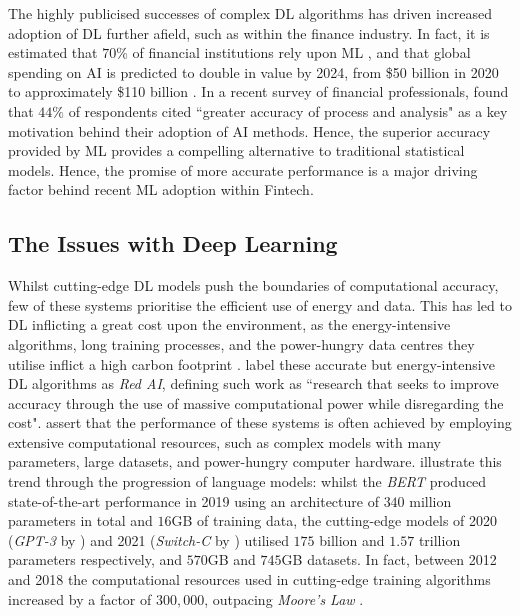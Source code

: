 \documentclass[a4paper, 11pt]{report}
\begin{document}
    The highly publicised successes of complex DL algorithms has driven increased adoption of DL further afield, such as within the finance industry. In fact, it is estimated that $70\%$ of financial institutions rely upon ML \citep{gokhale-2019}, and that global spending on AI is predicted to double in value by 2024, from \$50 billion in 2020 to approximately \$110 billion \citep{oecd-2021}. In a recent survey of financial professionals, \citet{chartis-2019} found that $44\%$ of respondents cited ``greater accuracy of process and analysis" as a key motivation behind their adoption of AI methods. Hence, the superior accuracy provided by ML provides a compelling alternative to traditional statistical models. Hence, the promise of more accurate performance is a major driving factor behind recent ML adoption within Fintech.


    \subsection{The Issues with Deep Learning}

    Whilst cutting-edge DL models push the boundaries of computational accuracy, few of these systems prioritise the efficient use of energy and data. This has led to DL inflicting a great cost upon the environment, as the energy-intensive algorithms, long training processes, and the power-hungry data centres they utilise inflict a high carbon footprint \citep{lacoste-2019}. \citet{schwartz-2019} label these accurate but energy-intensive DL algorithms as \emph{Red AI}, defining such work as ``research that seeks to improve accuracy through the use of massive computational power while disregarding the cost". \citeauthor{schwartz-2019} assert that the performance of these systems is often achieved by employing extensive computational resources, such as complex models with many parameters, large datasets, and power-hungry computer hardware. \citet{bender-2021} illustrate this trend through the progression of language models: whilst the \emph{BERT} \citep{devlin-2018} produced state-of-the-art performance in 2019 using an architecture of $340$ million parameters in total and $16$GB of training data, the cutting-edge models of 2020 (\emph{GPT-3} by \citet{brown-2020}) and 2021 (\emph{Switch-C} by \citet{fedus-2021}) utilised $175$ billion and $1.57$ trillion parameters respectively, and $570$GB and $745$GB datasets. In fact, between 2012 and 2018 the computational resources used in cutting-edge training algorithms increased by a factor of $300,000$, outpacing \emph{Moore's Law} \citep{amodei-2018}.
\end{document}
